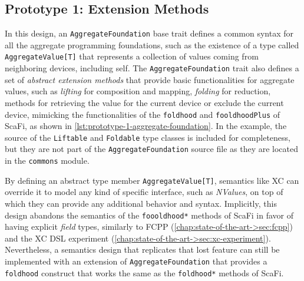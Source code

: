 \subsection{Prototype 1: Extension Methods} \label{chap:design->sec:dsl->subsec:prototype-1-extension-methods}

In this design, an \texttt{AggregateFoundation} base trait defines a common syntax for all the aggregate programming foundations, such as the existence of a type called \texttt{AggregateValue[T]} that represents a collection of values coming from neighboring devices, including self.
%
The \texttt{AggregateFoundation} trait also defines a set of \textit{abstract extension methods} that provide basic functionalities for aggregate values, such as \textit{lifting} for composition and mapping, \textit{folding} for reduction, methods for retrieving the value for the current device or exclude the current device, mimicking the functionalities of the \texttt{foldhood} and \texttt{fooldhoodPlus} of ScaFi, as shown in \cref{lst:prototype-1-aggregate-foundation}.
%
In the example, the source of the \texttt{Liftable} and \texttt{Foldable} type classes is included for completeness, but they are not part of the \texttt{AggregateFoundation} source file as they are located in the \texttt{commons} module.



By defining an abstract type member \texttt{AggregateValue[T]}, semantics like \ac{XC} can override it to model any kind of specific interface, such as \textit{NValues}, on top of which they can provide any additional behavior and syntax.
%
Implicitly, this design abandons the  semantics of the \texttt{foooldhood*} methods of ScaFi in favor of having explicit \textit{field} types, similarly to FCPP (\cref{chap:state-of-the-art->sec:fcpp}) and the \ac{XC} \ac{DSL} experiment (\cref{chap:state-of-the-art->sec:xc-experiment}).
%
Nevertheless, a semantics design that replicates that lost feature can still be implemented with an extension of \texttt{AggregateFoundation} that provides a \texttt{foldhood} construct that works the same as the \texttt{foldhood*} methods of ScaFi.

